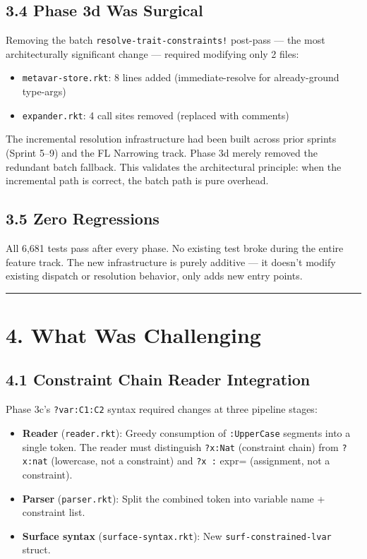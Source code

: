 \documentclass[11pt]{article}
\begin{document}
\subsection{3.4 Phase 3d Was Surgical}
\label{sec:orgfb49f6b}

Removing the batch \texttt{resolve-trait-constraints!} post-pass — the most architecturally
significant change — required modifying only 2 files:

\begin{itemize}
\item \texttt{metavar-store.rkt}: 8 lines added (immediate-resolve for already-ground type-args)
\item \texttt{expander.rkt}: 4 call sites removed (replaced with comments)
\end{itemize}

The incremental resolution infrastructure had been built across prior sprints (Sprint
5–9) and the FL Narrowing track. Phase 3d merely removed the redundant batch fallback.
This validates the architectural principle: when the incremental path is correct, the
batch path is pure overhead.
\subsection{3.5 Zero Regressions}
\label{sec:org5faa507}

All 6,681 tests pass after every phase. No existing test broke during the entire
feature track. The new infrastructure is purely additive — it doesn't modify existing
dispatch or resolution behavior, only adds new entry points.

\noindent\rule{\textwidth}{0.5pt}
\section{4. What Was Challenging}
\label{sec:org4615807}

\subsection{4.1 Constraint Chain Reader Integration}
\label{sec:orgcd309f8}

Phase 3c's \texttt{?var:C1:C2} syntax required changes at three pipeline stages:

\begin{itemize}
\item \textbf{Reader} (\texttt{reader.rkt}): Greedy consumption of \texttt{:UpperCase} segments into a single
token. The reader must distinguish \texttt{?x:Nat} (constraint chain) from \texttt{?x:nat}
(lowercase, not a constraint) and \texttt{?x :} expr= (assignment, not a constraint).
\item \textbf{Parser} (\texttt{parser.rkt}): Split the combined token into variable name + constraint list.
\item \textbf{Surface syntax} (\texttt{surface-syntax.rkt}): New \texttt{surf-constrained-lvar} struct.
\end{itemize}
\end{document}
